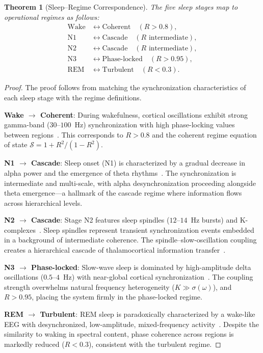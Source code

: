 \documentclass[aps,prd,twocolumn,superscriptaddress,floatfix,nofootinbib]{revtex4-2}
\newtheorem{theorem}{Theorem}[section]
\theoremstyle{remark}
\newcommand{\Rorder}{R}
\newcommand{\Sregime}{\mathcal{S}}
\begin{document}
\begin{theorem}[Sleep--Regime Correspondence]
\label{thm:sleep_regime}
The five sleep stages map to operational regimes as follows:
\begin{equation}
    \boxed{
    \begin{aligned}
        \text{Wake} &\longleftrightarrow \text{Coherent} \quad (\Rorder > 0.8), \\
        \text{N1} &\longleftrightarrow \text{Cascade} \quad (\Rorder \text{ intermediate}), \\
        \text{N2} &\longleftrightarrow \text{Cascade} \quad (\Rorder \text{ intermediate}), \\
        \text{N3} &\longleftrightarrow \text{Phase-locked} \quad (\Rorder > 0.95), \\
        \text{REM} &\longleftrightarrow \text{Turbulent} \quad (\Rorder < 0.3).
    \end{aligned}
    }
    \label{eq:sleep_regime}
\end{equation}
\end{theorem}

\begin{proof}
The proof follows from matching the synchronization characteristics of each sleep stage with the regime definitions.

\textbf{Wake $\to$ Coherent}: During wakefulness, cortical oscillations exhibit strong gamma-band ($30$--$100$~Hz) synchronization with high phase-locking values between regions~\cite{fries2005mechanism,varela2001brainweb}. This corresponds to $\Rorder > 0.8$ and the coherent regime equation of state $\Sregime = 1 + \Rorder^2/(1-\Rorder^2)$.

\textbf{N1 $\to$ Cascade}: Sleep onset (N1) is characterized by a gradual decrease in alpha power and the emergence of theta rhythms~\cite{steriade2006grouping}. The synchronization is intermediate and multi-scale, with alpha desynchronization proceeding alongside theta emergence---a hallmark of the cascade regime where information flows across hierarchical levels.

\textbf{N2 $\to$ Cascade}: Stage N2 features sleep spindles ($12$--$14$~Hz bursts) and K-complexes~\cite{dangvu2014eeg}. Sleep spindles represent transient synchronization events embedded in a background of intermediate coherence. The spindle--slow-oscillation coupling creates a hierarchical cascade of thalamocortical information transfer~\cite{diekelmann2010memory}.

\textbf{N3 $\to$ Phase-locked}: Slow-wave sleep is dominated by high-amplitude delta oscillations ($0.5$--$4$~Hz) with near-global cortical synchronization~\cite{steriade2003neuronal}. The coupling strength overwhelms natural frequency heterogeneity ($K \gg \sigma(\omega)$), and $\Rorder > 0.95$, placing the system firmly in the phase-locked regime.

\textbf{REM $\to$ Turbulent}: REM sleep is paradoxically characterized by a wake-like EEG with desynchronized, low-amplitude, mixed-frequency activity~\cite{hobson2002cognitive}. Despite the similarity to waking in spectral content, phase coherence across regions is markedly reduced ($\Rorder < 0.3$), consistent with the turbulent regime.
\end{proof}
\end{document}
